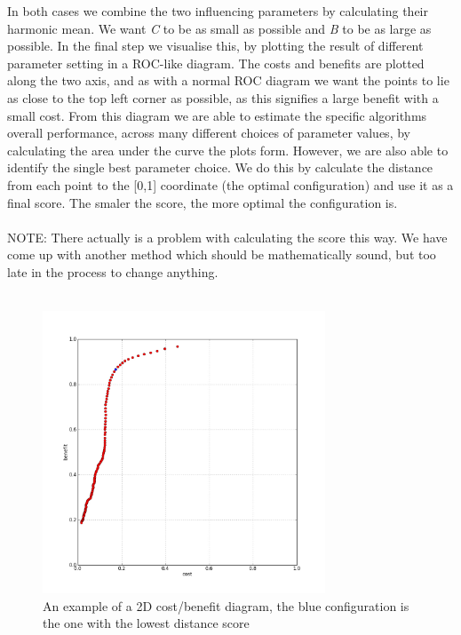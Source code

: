 In both cases we combine the two influencing parameters by calculating their harmonic mean. We want \textit{C} to be as small as possible and \textit{B} to be as large as possible. In the final step we visualise this, by plotting the result of different parameter setting in a ROC-like diagram. The costs and benefits are plotted along the two axis, and as with a normal ROC diagram we want the points to lie as close to the top left corner as possible, as this signifies a large benefit with a small cost. From this diagram we are able to estimate the specific algorithms overall performance, across many different choices of parameter values, by calculating the area under the curve the plots form. However, we are also able to identify the single best parameter choice. We do this by calculate the distance from each point to the [0,1] coordinate (the optimal configuration) and use it as a final score. The smaler the score, the more optimal the configuration is.\\\\
%
NOTE: There actually is a problem with calculating the score this way. We have come up with another method which should be mathematically sound, but too late in the process to change anything.\\\\
%
\begin{figure}
     \centering
     \includegraphics[width=0.75\textwidth]{img/2dcostbenefitexample2.jpg}
     \caption{An example of a 2D cost/benefit diagram, the blue configuration is the one with the lowest distance score}
\end{figure}
%
%
